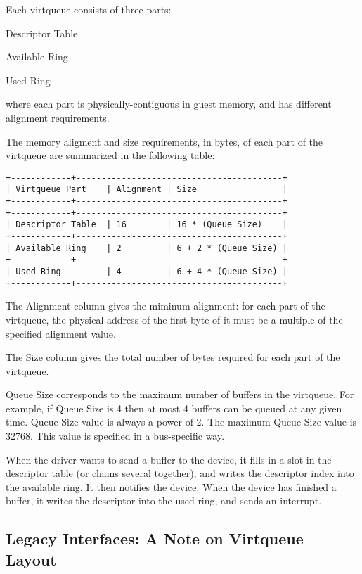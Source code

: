 Each virtqueue consists of three parts:

        Descriptor Table

        Available Ring

        Used Ring

where each part is physically-contiguous in guest memory,
and has different alignment requirements.

The memory aligment and size requirements, in bytes, of each part of the
virtqueue are summarized in the following table:

\begin{verbatim}
+------------+-----------------------------------------+
| Virtqueue Part    | Alignment | Size                 |
+------------+-----------------------------------------+
+------------+-----------------------------------------+
| Descriptor Table  | 16        | 16 * (Queue Size)    |
+------------+-----------------------------------------+
| Available Ring    | 2         | 6 + 2 * (Queue Size) |
+------------+-----------------------------------------+
| Used Ring         | 4         | 6 + 4 * (Queue Size) |
+------------+-----------------------------------------+
\end{verbatim}

The Alignment column gives the miminum alignment: for each part
of the virtqueue, the physical address of the first byte of it
must be a multiple of the specified alignment value.

The Size column gives the total number of bytes required for each
part of the virtqueue.

Queue Size corresponds to the maximum number of buffers in the
virtqueue.  For example, if Queue Size is 4 then at most 4 buffers
can be queued at any given time.  Queue Size value is always a
power of 2.  The maximum Queue Size value is 32768.  This value
is specified in a bus-specific way.

When the driver wants to send a buffer to the device, it fills in
a slot in the descriptor table (or chains several together), and
writes the descriptor index into the available ring.  It then
notifies the device. When the device has finished a buffer, it
writes the descriptor into the used ring, and sends an interrupt.


\subsection{Legacy Interfaces: A Note on Virtqueue Layout}\label{sec:Basic Facilities of a Virtio Device / Virtqueues / Legacy Interfaces: A Note on Virtqueue Layout}

